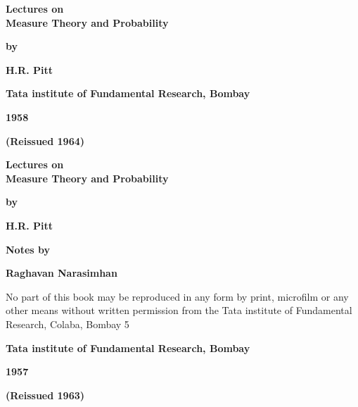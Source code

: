 \thispagestyle{empty}
\begin{center}
{\Large\bf Lectures on}\\[5pt]
{\Large\bf Measure Theory and Probability}
\vskip 1cm

{\bf by}
\medskip

{\large\bf H.R. Pitt}
\vfill

{\bf Tata institute of Fundamental Research, Bombay}

{\bf 1958}

{\bf (Reissued 1964)}
\end{center}

\eject


\thispagestyle{empty}
\begin{center}
{\Large\bf Lectures on}\\[5pt]
{\Large\bf Measure Theory and Probability}
\vskip 1cm

{\bf by}
\medskip

{\large\bf H.R. Pitt}
\vfill

{\bf Notes by}
\medskip

{\large\bf Raghavan Narasimhan}
\vfill

\parbox{0.7\textwidth}{
No part of this book may be reproduced in any form by
print, microfilm or any other means without written 
permission from the Tata institute of Fundamental Research, 
Colaba, Bombay 5}
\vfill

{\bf Tata institute of Fundamental Research, Bombay}

{\bf 1957}

{\bf (Reissued 1963)}
\end{center}


